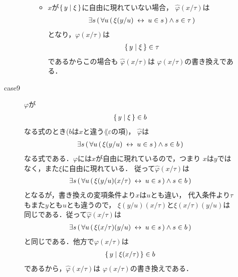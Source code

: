 \begin{metaprf}[第一]
\begin{description}
\begin{description}
\begin{itemize}
\begin{itemize}
									\item $x$が$\{\, y \mid \xi\, \}$に自由に現れていない場合，
										$\widehat{\varphi}(x/\tau)$は
										\begin{align}
											\exists s\, (\, \forall u\, (\, \xi(y/u) \hspace{0.25em}\leftrightarrow\hspace{0.25em} u \in s\, ) \wedge s \in \tau\, )
										\end{align}
										となり，$\varphi(x/\tau)$は
										\begin{align}
											\{\, y \mid \xi\, \} \in \tau
										\end{align}
										であるからこの場合も
										$\widehat{\varphi}(x/\tau)$は
										$\varphi(x/\tau)$の書き換えである．
								\end{itemize}
						\end{itemize}
					
					\item[case9] $\varphi$が
						\begin{align}
							\{\, y \mid \xi\, \} \in b
						\end{align}
						なる式のとき($b$は$x$と違う$\lang{\varepsilon}$の項)，
						$\widehat{\varphi}$は
						\begin{align}
							\exists s\, (\, \forall u\, (\, \xi(y/u) \hspace{0.25em}\leftrightarrow\hspace{0.25em} u \in s\, ) \wedge s \in b\, )
						\end{align}
						なる式である．$\varphi$には$x$が自由に現れているので，つまり
						$x$は$y$ではなく，また$\xi$に自由に現れている．
						従って$\widehat{\varphi}(x/\tau)$は
						\begin{align}
							\exists s\, (\, \forall u\, (\, \xi(y/u)(x/\tau) \hspace{0.25em}\leftrightarrow\hspace{0.25em} u \in s\, ) \wedge s \in b\, )
						\end{align}
						となるが，書き換えの変項条件より$x$は$u$とも違い，
						代入条件より$\tau$もまた$y$とも$u$とも違うので，
						$\xi(y/u)(x/\tau)$と$\xi(x/\tau)(y/u)$は
						同じである．従って$\widehat{\varphi}(x/\tau)$は
						\begin{align}
							\exists s\, (\, \forall u\, (\, \xi(x/\tau)(y/u) \hspace{0.25em}\leftrightarrow\hspace{0.25em} u \in s\, ) \wedge s \in b\, )
						\end{align}
						と同じである．他方で$\varphi(x/\tau)$は
						\begin{align}
							\{\, y \mid \xi(x/\tau)\, \} \in b
						\end{align}
						であるから，$\widehat{\varphi}(x/\tau)$は
						$\varphi(x/\tau)$の書き換えである．
						

\end{description}
\end{description}
\end{metaprf}
